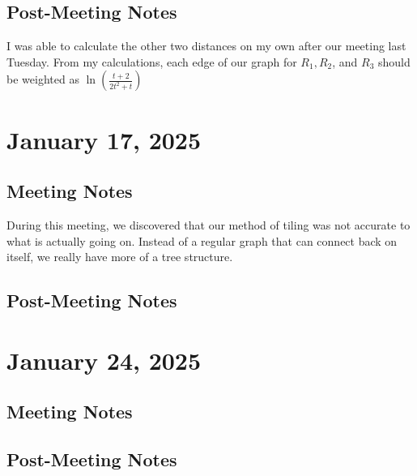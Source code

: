 \documentclass{amsart}
\begin{document}
\subsection{Post-Meeting Notes}

I was able to calculate the other two distances on my own after our meeting last Tuesday. From my calculations, each edge of our graph for $R_1, R_2$, and $R_3$ should be weighted as $\ln \left( \frac{t+2}{2t^2 + t}\right)$

\section{January 17, 2025}
\subsection{Meeting Notes}
During this meeting, we discovered that our method of tiling was not accurate to what is actually going on. Instead of a regular graph that can connect back on itself, we really have more of a tree structure. 
\subsection{Post-Meeting Notes}

\section{January 24, 2025}

\subsection{Meeting Notes}

\subsection{Post-Meeting Notes}

\newpage
\printbibliography
\end{document}
